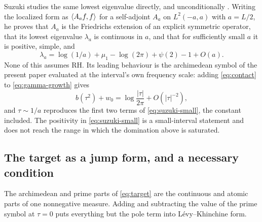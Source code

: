\begin{remark}\label{rem:suzuki}
Suzuki studies the same lowest eigenvalue directly, and unconditionally
\cite{Suzuki}. Writing the localized form as $\langle A_af,f\rangle$ for a self-adjoint
$A_a$ on $L^2(-a,a)$ with $a=L/2$, he proves that $A_a$ is the Friedrichs
extension of an explicit symmetric operator, that its lowest eigenvalue
$\lambda_a$ is continuous in $a$, and that for sufficiently small $a$ it is
positive, simple, and
\begin{equation}\label{eq:suzuki-small}
 \lambda_a=\log(1/a)+\mu_1-\log(2\pi)+\psi(2)-1+O(a).
\end{equation}
None of this assumes RH. Its leading behaviour is the archimedean symbol of the
present paper evaluated at the interval's own frequency scale: adding
\eqref{eq:contact} to \eqref{eq:gamma-growth} gives
\begin{equation}\label{eq:symbol-log}
 b(\tau^2)+w_0=\log\frac{|\tau|}{2\pi}+O(|\tau|^{-2}),
\end{equation}
and $\tau\sim1/a$ reproduces the first two terms of \eqref{eq:suzuki-small},
the constant included. The positivity in \eqref{eq:suzuki-small} is a
small-interval statement and does not reach the range in which the domination
above is saturated.
\end{remark}

\subsection{The target as a jump form, and a necessary condition}
\label{subsec:jump}
The archimedean and prime parts of \eqref{eq:target} are the continuous and
atomic parts of one nonnegative measure. Adding and subtracting the value of the
prime symbol at $\tau=0$ puts everything but the pole term into
L\'evy--Khinchine form.

